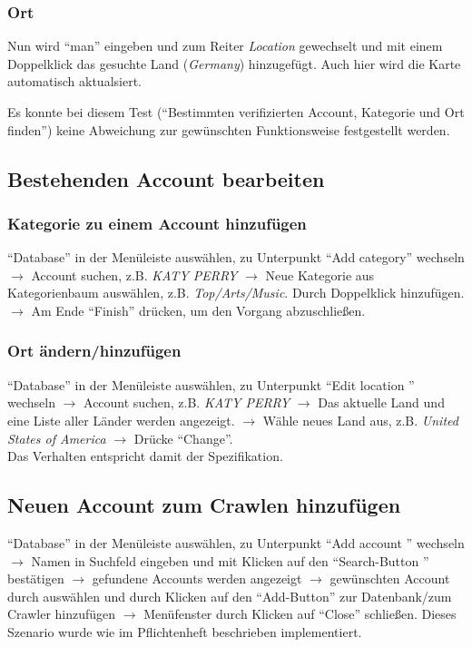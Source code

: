 \subsubsection{Ort}
Nun wird "`man"' eingeben und zum Reiter \textit{Location} gewechselt und mit einem Doppelklick das gesuchte Land (\textit{Germany}) hinzugefügt. Auch hier wird die Karte automatisch aktualsiert.

Es konnte bei diesem Test ("`Bestimmten verifizierten Account, Kategorie und Ort finden"') keine Abweichung zur gewünschten Funktionsweise festgestellt werden.
\subsection{Bestehenden Account bearbeiten}
\subsubsection{Kategorie zu einem Account hinzufügen}
"`Database"' in der Menüleiste auswählen, zu Unterpunkt "`Add category"' wechseln $\to$ Account suchen, z.B. \textit{KATY PERRY} $\to$ Neue Kategorie aus Kategorienbaum auswählen, z.B. \textit{Top/Arts/Music}. Durch Doppelklick hinzufügen. $\to$ Am Ende "`Finish"' drücken, um den Vorgang abzuschließen.
\subsubsection{Ort ändern/hinzufügen}
"`Database"' in der Menüleiste auswählen, zu Unterpunkt "`Edit location "' wechseln $\to$ Account suchen, z.B. \textit{KATY PERRY} $\to$ Das aktuelle Land und eine Liste aller Länder werden angezeigt. $\to$ Wähle neues Land aus, z.B. \textit{United States of America} $\to$ Drücke "`Change"'.\\
Das Verhalten entspricht damit der Spezifikation.

\subsection{Neuen Account zum Crawlen hinzufügen} \label{sec:AddNewAccount}
"`Database"' in der Menüleiste auswählen, zu Unterpunkt "`Add account "' wechseln $\to$ Namen in Suchfeld eingeben und mit Klicken auf den "`Search-Button "' bestätigen $\to $ gefundene Accounts werden angezeigt $\to$ gewünschten Account durch auswählen und durch Klicken auf den "`Add-Button"' zur Datenbank/zum Crawler hinzufügen $\to$ Menüfenster durch Klicken auf "`Close"' schließen.
Dieses Szenario wurde wie im Pflichtenheft beschrieben implementiert.

